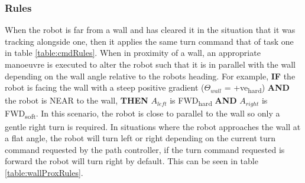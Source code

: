 \documentclass[10pt]{article}
\begin{document}
\subsubsection{Rules}
When the robot is far from a wall and has cleared it in the situation that it was tracking alongside one, then it applies the same turn command that of task one in table \ref{table:cmdRules}.
When in proximity of a wall, an appropriate manoeuvre is executed to alter the robot such that it is in parallel with the wall depending on the wall angle relative to the robots heading. 
For example, \textbf{IF} the robot is facing the wall with a steep positive gradient ($\Theta_{wall}$ = +ve\textsubscript{hard}) \textbf{AND} the robot is NEAR to the wall, \textbf{THEN} $A_{left}$ is FWD\textsubscript{hard} \textbf{AND} $A_{right}$ is FWD\textsubscript{soft}.
In this scenario, the robot is close to parallel to the wall so only a gentle right turn is required.
In situations where the robot approaches the wall at a flat angle, the robot will turn left or right depending on the current turn command requested by the path controller, if the turn command requested is forward the robot will turn right by default.
This can be seen in table \ref{table:wallProxRules}. 
\end{document}
